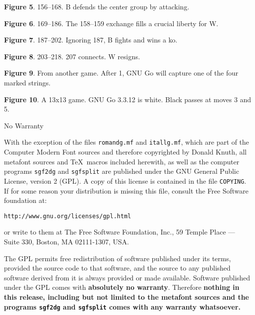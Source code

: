 \bigbreak
\centerline{\hglue-20pt}
\medbreak
\centerline{{\bf Figure 5}. 156--168. B defends the center group by attacking.}

\bigbreak

\centerline{\hglue-20pt}
\medbreak
\centerline{{\bf Figure 6}. 169--186. The 158--159 exchange fills a crucial
liberty for W.}

\centerline{\hglue-20pt}
\medbreak
\centerline{{\bf Figure 7}. 187--202. Ignoring 187, B fights and wins a ko.}
\bigbreak

\centerline{\hglue-20pt}
\medbreak
\centerline{{\bf Figure 8}. 203--218. 207 connects. W resigns.}

\centerline{\hglue-20pt}
\medbreak
\centerline{{\bf Figure 9}. From another game. After 1, GNU Go will
capture one of the four marked strings.}
\bigbreak

{\hfil{}\hfil{}}
\medbreak
\centerline{{\bf Figure 10}. A 13x13 game. GNU Go 3.3.12 is white. 
Black passes at moves 3 and 5.}

\vfil\eject

\centerline{\titlefont No Warranty}
\medbreak

With the exception of the files {\tt romandg.mf} and {\tt itallg.mf}, 
which are part of the Computer Modern Font sources and therefore copyrighted
by Donald Knuth, all metafont sources and \TeX\ macros included herewith, as
well as the computer programs {\tt sgf2dg} and {\tt sgfsplit} are
published under the GNU General Public License, version 2 (GPL). 
A copy of this license is contained in the file {\tt COPYING}. If for some
reason your distribution is missing this file, consult the Free Software
foundation at:
\smallskip
\centerline{\tt http://www.gnu.org/licenses/gpl.html}
\smallskip\noindent
or write to them at The Free Software Foundation, Inc., 59 Temple Place ---
Suite 330, Boston, MA 02111-1307, USA.

The GPL permits free redistribution of software published under its terms,
provided the source code to that software, and the source to any published
software derived from it is always provided or made available. Software
published under the GPL comes with {\bf absolutely no warranty}. Therefore
{\bf nothing in this release, including but not limited to the metafont
sources and the programs {\tt sgf2dg} and {\tt sgfsplit} comes with any
warranty whatsoever.}

